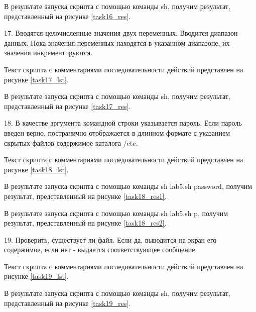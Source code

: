 
В результате запуска скрипта с помощью команды sh, получим результат, представленный на рисунке \ref{task16_res}.


17. Вводятся  целочисленные  значения  двух  переменных.  Вводится диапазон данных. Пока значения переменных находятся в указанном диапазоне, их значения инкрементируются.

Текст скрипта с комментариями последовательности действий представлен на рисунке \ref{task17_lst}.


В результате запуска скрипта с помощью команды sh, получим результат, представленный на рисунке \ref{task17_res}.


18. В  качестве  аргумента  командной  строки  указывается  пароль.  Если пароль  введен  верно,  постранично  отображается  в  длинном  формате  с указанием скрытых файлов содержимое каталога /etc.

Текст скрипта с комментариями последовательности действий представлен на рисунке \ref{task18_lst}.


В результате запуска скрипта с помощью команды sh lab5.sh password, получим результат, представленный на рисунке \ref{task18_res1}.


В результате запуска скрипта с помощью команды sh lab5.sh p, получим результат, представленный на рисунке \ref{task18_res2}.


19. Проверить,  существует  ли  файл.  Если  да,  выводится  на  экран  его содержимое, если нет - выдается соответствующее сообщение.

Текст скрипта с комментариями последовательности действий представлен на рисунке \ref{task19_lst}.


В результате запуска скрипта с помощью команды sh, получим результат, представленный на рисунке \ref{task19_res}.

